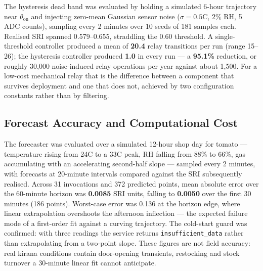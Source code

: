 \documentclass[conference]{IEEEtran}
\begin{document}
The hysteresis dead band was evaluated by holding a simulated 6-hour
trajectory near $\theta_{\text{on}}$ and injecting zero-mean Gaussian
sensor noise ($\sigma = 0.5$\textdegree C, $2\%$ RH, 5 ADC counts),
sampling every 2 minutes over 10 seeds of 181 samples each. Realised SRI
spanned 0.579--0.655, straddling the 0.60 threshold. A single-threshold
controller produced a mean of \textbf{20.4} relay transitions per run
(range 15--26); the hysteresis controller produced \textbf{1.0} in every
run --- a \textbf{95.1\%} reduction, or roughly 30{,}000 noise-induced
relay operations per year against about 1{,}500. For a low-cost mechanical
relay that is the difference between a component that survives deployment
and one that does not, achieved by two configuration constants rather than
by filtering.

\subsection{Forecast Accuracy and Computational Cost}
\label{sec:cost}

The forecaster was evaluated over a simulated 12-hour shop day for tomato
--- temperature rising from 24\textdegree C to a 33\textdegree C peak, RH
falling from 88\% to 66\%, gas accumulating with an accelerating
second-half slope --- sampled every 2 minutes, with forecasts at 20-minute
intervals compared against the SRI subsequently realised. Across 31
invocations and 372 predicted points, mean absolute error over the
60-minute horizon was \textbf{0.0085} SRI units, falling to
\textbf{0.0050} over the first 30 minutes (186 points). Worst-case error
was 0.136 at the horizon edge, where linear extrapolation overshoots the
afternoon inflection --- the expected failure mode of a first-order fit
against a curving trajectory. The cold-start guard was confirmed: with
three readings the service returns \texttt{insufficient\_data} rather than
extrapolating from a two-point slope. These figures are not field
accuracy: real kirana conditions contain door-opening transients,
restocking and stock turnover a 30-minute linear fit cannot anticipate.
\end{document}
